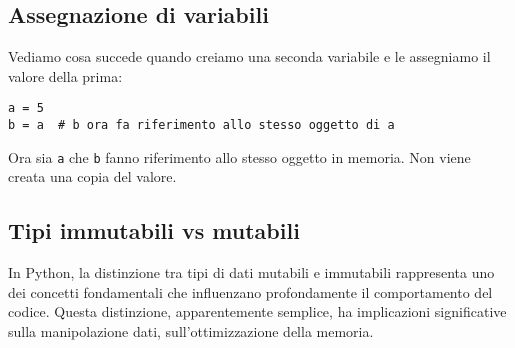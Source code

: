 \subsection{Assegnazione di variabili}

Vediamo cosa succede quando creiamo una seconda variabile e le assegniamo il valore della prima:

\begin{lstlisting}
a = 5
b = a  # b ora fa riferimento allo stesso oggetto di a
\end{lstlisting}

\begin{center}
\end{center}

Ora sia \texttt{a} che \texttt{b} fanno riferimento allo stesso oggetto in memoria. Non viene creata una copia del valore.

\subsection{Tipi immutabili vs mutabili}\label{mutableImmutable}
    In Python, la distinzione tra tipi di dati mutabili e immutabili rappresenta uno dei concetti fondamentali che influenzano profondamente il comportamento del codice. Questa distinzione, apparentemente semplice, ha implicazioni significative sulla manipolazione dati, sull'ottimizzazione della memoria.

